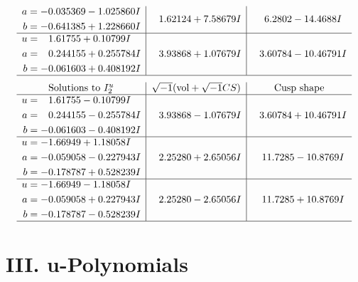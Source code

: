 \documentclass[1p]{elsarticle_modified}
\theoremstyle{definition}
\newcommand{\I}{\sqrt{-1}}
\begin{document}
$$\begin{array}{c|c|c}
\begin{aligned}
a &= -0.035369 - 1.025860 I \\
b &= -0.641385 + 1.228660 I\end{aligned}
 & \phantom{-}1.62124 + 7.58679 I & \phantom{-}6.2802 - 14.4688 I \\ \hline\begin{aligned}
u &= \phantom{-}1.61755 + 0.10799 I \\
a &= \phantom{-}0.244155 + 0.255784 I \\
b &= -0.061603 + 0.408192 I\end{aligned}
 & \phantom{-}3.93868 + 1.07679 I & \phantom{-}3.60784 - 10.46791 I\\
 \hline 
 \end{array}$$\newpage$$\begin{array}{c|c|c}  
\text{Solutions to }I^u_{2}& \I (\text{vol} + \sqrt{-1}CS) & \text{Cusp shape}\\
 \hline 
\begin{aligned}
u &= \phantom{-}1.61755 - 0.10799 I \\
a &= \phantom{-}0.244155 - 0.255784 I \\
b &= -0.061603 - 0.408192 I\end{aligned}
 & \phantom{-}3.93868 - 1.07679 I & \phantom{-}3.60784 + 10.46791 I \\ \hline\begin{aligned}
u &= -1.66949 + 1.18058 I \\
a &= -0.059058 - 0.227943 I \\
b &= -0.178787 + 0.528239 I\end{aligned}
 & \phantom{-}2.25280 + 2.65056 I & \phantom{-}11.7285 - 10.8769 I \\ \hline\begin{aligned}
u &= -1.66949 - 1.18058 I \\
a &= -0.059058 + 0.227943 I \\
b &= -0.178787 - 0.528239 I\end{aligned}
 & \phantom{-}2.25280 - 2.65056 I & \phantom{-}11.7285 + 10.8769 I\\
 \hline 
 \end{array}$$\newpage
\newpage\renewcommand{\arraystretch}{1}
\centering \section*{ III. u-Polynomials}
\end{document}

